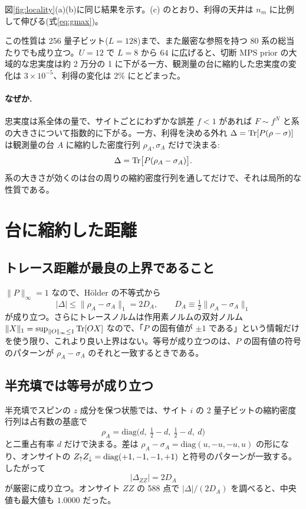 図\ref{fig:locality}(a)(b)に同じ結果を示す。(c) のとおり、利得の天井は $n_m$ に比例して伸びる(式\eqref{eq:gmax})。

この性質は 256 量子ビット($L=128$)まで、また厳密な参照を持つ 80 系の総当たりでも成り立つ。$U=12$ で $L=8$ から $64$ に広げると、切断 MPS prior の大域的な忠実度は約 2 万分の 1 に下がる一方、観測量の台に縮約した忠実度の変化は $3\times10^{-5}$、利得の変化は 2\% にとどまった。

\paragraph{なぜか.}忠実度は系全体の量で、サイトごとにわずかな誤差 $f<1$ があれば $F\sim f^{N}$ と系の大きさについて指数的に下がる。一方、利得を決める外れ $\Delta=\operatorname{Tr}[P(\rho-\sigma)]$ は観測量の台 $A$ に縮約した密度行列 $\rho_A,\sigma_A$ だけで決まる:
\begin{equation}
  \Delta=\operatorname{Tr}\bigl[P(\rho_A-\sigma_A)\bigr].
\end{equation}
系の大きさが効くのは台の周りの縮約密度行列を通してだけで、それは局所的な性質である。

\section{台に縮約した距離}
\label{sec:tracedist}

\subsection{トレース距離が最良の上界であること}
$\lVert P\rVert_\infty=1$ なので、H\"older の不等式から
\begin{equation}
  \lvert\Delta\rvert\le\lVert\rho_A-\sigma_A\rVert_1=2D_A,\qquad D_A\equiv\tfrac12\lVert\rho_A-\sigma_A\rVert_1
  \label{eq:holder}
\end{equation}
が成り立つ。さらにトレースノルムは作用素ノルムの双対ノルム $\lVert X\rVert_1=\sup_{\lVert O\rVert_\infty\le1}\operatorname{Tr}[OX]$ なので、「$P$ の固有値が $\pm1$ である」という情報だけを使う限り、これより良い上界はない。等号が成り立つのは、$P$ の固有値の符号のパターンが $\rho_A-\sigma_A$ のそれと一致するときである。

\subsection{半充填では等号が成り立つ}
半充填でスピンの $z$ 成分を保つ状態では、サイト $i$ の 2 量子ビットの縮約密度行列は占有数の基底で
\begin{equation}
  \rho_A=\mathrm{diag}\bigl(d,\ \tfrac12-d,\ \tfrac12-d,\ d\bigr)
\end{equation}
と二重占有率 $d$ だけで決まる。差は $\rho_A-\sigma_A=\mathrm{diag}(u,-u,-u,u)$ の形になり、オンサイトの $Z_\uparrow Z_\downarrow=\mathrm{diag}(+1,-1,-1,+1)$ と符号のパターンが一致する。したがって
\begin{equation}
  \lvert\Delta_{ZZ}\rvert=2D_A
\end{equation}
が厳密に成り立つ。オンサイト $ZZ$ の 588 点で $\lvert\Delta\rvert/(2D_A)$ を調べると、中央値も最大値も $1.0000$ だった。

